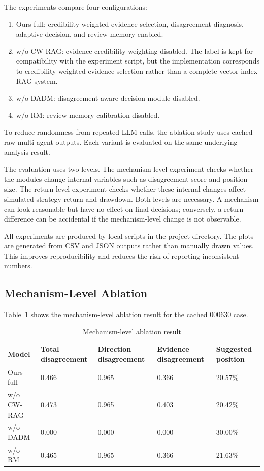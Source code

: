 \documentclass[14pt,a4paper]{extarticle}
\begin{document}
The experiments compare four configurations:

\begin{enumerate}[label=\arabic*)]
  \item Ours-full: credibility-weighted evidence selection, disagreement diagnosis, adaptive decision, and review memory enabled.
  \item w/o CW-RAG: evidence credibility weighting disabled. The label is kept for compatibility with the experiment script, but the implementation corresponds to credibility-weighted evidence selection rather than a complete vector-index RAG system.
  \item w/o DADM: disagreement-aware decision module disabled.
  \item w/o RM: review-memory calibration disabled.
\end{enumerate}

To reduce randomness from repeated LLM calls, the ablation study uses cached raw multi-agent outputs. Each variant is evaluated on the same underlying analysis result.

The evaluation uses two levels. The mechanism-level experiment checks whether the modules change internal variables such as disagreement score and position size. The return-level experiment checks whether these internal changes affect simulated strategy return and drawdown. Both levels are necessary. A mechanism can look reasonable but have no effect on final decisions; conversely, a return difference can be accidental if the mechanism-level change is not observable.

All experiments are produced by local scripts in the project directory. The plots are generated from CSV and JSON outputs rather than manually drawn values. This improves reproducibility and reduces the risk of reporting inconsistent numbers.

\subsection{Mechanism-Level Ablation}

Table~\ref{tab:ablation} shows the mechanism-level ablation result for the cached 000630 case.

\begin{table}[H]
\caption{Mechanism-level ablation result}
\label{tab:ablation}
\centering
\begin{tabular}{|p{}|p{}|p{}|p{}|p{}|}
\hline
Model & Total disagreement & Direction disagreement & Evidence disagreement & Suggested position \\
\hline
Ours-full & 0.466 & 0.965 & 0.366 & 20.57\% \\
\hline
w/o CW-RAG & 0.473 & 0.965 & 0.403 & 20.42\% \\
\hline
w/o DADM & 0.000 & 0.000 & 0.000 & 30.00\% \\
\hline
w/o RM & 0.465 & 0.965 & 0.366 & 21.63\% \\
\hline
\end{tabular}
\end{table}
\end{document}
